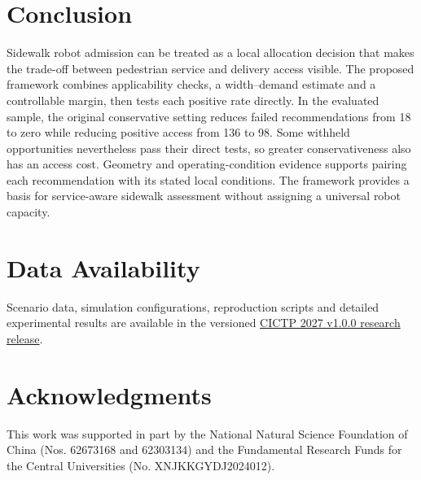 \documentclass[NewProceedings,letterpaper]{ascelike-new}
\begin{document}
\section{Conclusion}
Sidewalk robot admission can be treated as a local allocation decision that makes the trade-off between pedestrian service and delivery access visible. The proposed framework combines applicability checks, a width--demand estimate and a controllable margin, then tests each positive rate directly. In the evaluated sample, the original conservative setting reduces failed recommendations from 18 to zero while reducing positive access from 136 to 98. Some withheld opportunities nevertheless pass their direct tests, so greater conservativeness also has an access cost. Geometry and operating-condition evidence supports pairing each recommendation with its stated local conditions. The framework provides a basis for service-aware sidewalk assessment without assigning a universal robot capacity.

\section*{Data Availability}
Scenario data, simulation configurations, reproduction scripts and detailed experimental results are available in the versioned \href{https://github.com/AnXu-ITS/sidewalk-robot-quota/releases/tag/cictp2027-v1.0.0}{CICTP 2027 v1.0.0 research release}.

\section*{Acknowledgments}
This work was supported in part by the National Natural Science Foundation of China (Nos. 62673168 and 62303134) and the Fundamental Research Funds for the Central Universities (No. XNJKKGYDJ2024012).


\end{document}
